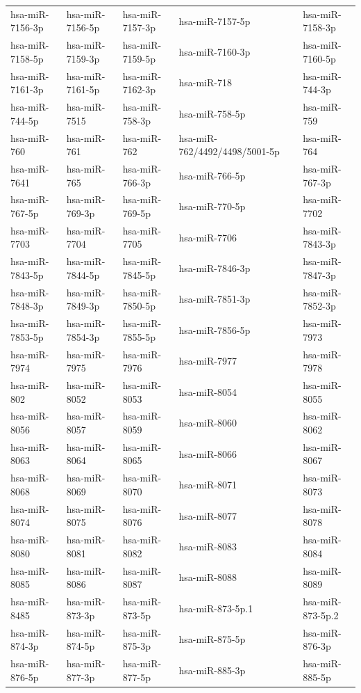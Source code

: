 \begin{longtable}{lllll}
hsa-miR-7156-3p & hsa-miR-7156-5p & hsa-miR-7157-3p & hsa-miR-7157-5p & hsa-miR-7158-3p \\
hsa-miR-7158-5p & hsa-miR-7159-3p & hsa-miR-7159-5p & hsa-miR-7160-3p & hsa-miR-7160-5p \\
hsa-miR-7161-3p & hsa-miR-7161-5p & hsa-miR-7162-3p & hsa-miR-718 & hsa-miR-744-3p \\
hsa-miR-744-5p & hsa-miR-7515 & hsa-miR-758-3p & hsa-miR-758-5p & hsa-miR-759 \\
hsa-miR-760 & hsa-miR-761 & hsa-miR-762 & hsa-miR-762/4492/4498/5001-5p & hsa-miR-764 \\
hsa-miR-7641 & hsa-miR-765 & hsa-miR-766-3p & hsa-miR-766-5p & hsa-miR-767-3p \\
hsa-miR-767-5p & hsa-miR-769-3p & hsa-miR-769-5p & hsa-miR-770-5p & hsa-miR-7702 \\
hsa-miR-7703 & hsa-miR-7704 & hsa-miR-7705 & hsa-miR-7706 & hsa-miR-7843-3p \\
hsa-miR-7843-5p & hsa-miR-7844-5p & hsa-miR-7845-5p & hsa-miR-7846-3p & hsa-miR-7847-3p \\
hsa-miR-7848-3p & hsa-miR-7849-3p & hsa-miR-7850-5p & hsa-miR-7851-3p & hsa-miR-7852-3p \\
hsa-miR-7853-5p & hsa-miR-7854-3p & hsa-miR-7855-5p & hsa-miR-7856-5p & hsa-miR-7973 \\
hsa-miR-7974 & hsa-miR-7975 & hsa-miR-7976 & hsa-miR-7977 & hsa-miR-7978 \\
hsa-miR-802 & hsa-miR-8052 & hsa-miR-8053 & hsa-miR-8054 & hsa-miR-8055 \\
hsa-miR-8056 & hsa-miR-8057 & hsa-miR-8059 & hsa-miR-8060 & hsa-miR-8062 \\
hsa-miR-8063 & hsa-miR-8064 & hsa-miR-8065 & hsa-miR-8066 & hsa-miR-8067 \\
hsa-miR-8068 & hsa-miR-8069 & hsa-miR-8070 & hsa-miR-8071 & hsa-miR-8073 \\
hsa-miR-8074 & hsa-miR-8075 & hsa-miR-8076 & hsa-miR-8077 & hsa-miR-8078 \\
hsa-miR-8080 & hsa-miR-8081 & hsa-miR-8082 & hsa-miR-8083 & hsa-miR-8084 \\
hsa-miR-8085 & hsa-miR-8086 & hsa-miR-8087 & hsa-miR-8088 & hsa-miR-8089 \\
hsa-miR-8485 & hsa-miR-873-3p & hsa-miR-873-5p & hsa-miR-873-5p.1 & hsa-miR-873-5p.2 \\
hsa-miR-874-3p & hsa-miR-874-5p & hsa-miR-875-3p & hsa-miR-875-5p & hsa-miR-876-3p \\
hsa-miR-876-5p & hsa-miR-877-3p & hsa-miR-877-5p & hsa-miR-885-3p & hsa-miR-885-5p \\

\end{longtable}
